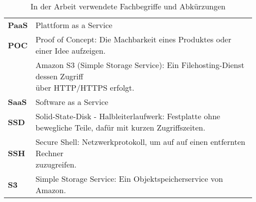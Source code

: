 \begin{table}[!htbp]
\begin{tabular}{p{}p{}}
	\textbf{PaaS} & Plattform as a Service\\
	\textbf{POC} & Proof of Concept: Die Machbarkeit eines Produktes oder einer Idee aufzeigen.\\
	\makecell[l]{\textbf{S3}} & \makecell[l]{Amazon S3 (Simple Storage Service): Ein Filehosting-Dienst dessen Zugriff\\ über HTTP/HTTPS erfolgt.}\\
	\textbf{SaaS} & Software as a Service\\
	\textbf{SSD} &  Solid-State-Disk - Halbleiterlaufwerk: Festplatte ohne bewegliche Teile, dafür mit kurzen Zugriffszeiten.\\
	\textbf{SSH} & \makecell[l]{Secure Shell: Netzwerkprotokoll, um auf auf einen entfernten Rechner\\ zuzugreifen.}\\
	\textbf{S3} & Simple Storage Service: Ein Objektspeicherservice von Amazon.\\
\end{tabular}
\caption{\label{tab:fachbegriffe}In der Arbeit verwendete Fachbegriffe und Abkürzungen}
\end{table}